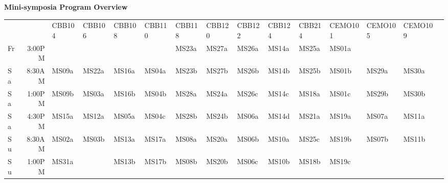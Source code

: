 \clearpage
\begin{center}
\label{prog-overview}
{\large {\bf Mini-symposia Program Overview}}

\vspace{0.5cm}
\begin{adjustbox}{width=\textwidth}
\begin{tabular}{lrlllllllllllll}
                         &        & CBB104 & CBB106 & CBB108 & CBB110 & CBB118 & CBB120 & CBB122 & CBB124 & CBB214 & CEMO101 & CEMO105 & CEMO109 \\
\rowcolor{p1color!20} Fr & 3:00PM &        &        &        &        & MS23a  & MS27a  & MS26a  & MS14a  & MS25a  & MS01a   &         &         \\
\rowcolor{p2color!30} Sa & 8:30AM & MS09a  & MS22a  & MS16a  & MS04a  & MS23b  & MS27b  & MS26b  & MS14b  & MS25b  & MS01b   & MS29a   & MS30a   \\
\rowcolor{p2color!20} Sa & 1:00PM & MS09b  & MS03a  & MS16b  & MS04b  & MS28a  & MS24a  & MS26c  & MS14c  & MS18a  & MS01c   & MS29b   & MS30b   \\
\rowcolor{p2color!10} Sa & 4:30PM & MS15a  & MS12a  & MS05a  & MS04c  & MS28b  & MS24b  & MS06a  & MS14d  & MS21a  & MS19a   & MS07a   & MS11a   \\
\rowcolor{p3color!30} Su & 8:30AM & MS02a  & MS03b  & MS13a  & MS17a  & MS08a  & MS20a  & MS06b  & MS10a  & MS25c  & MS19b   & MS07b   & MS11b   \\
\rowcolor{p3color!20} Su & 1:00PM & MS31a  &        & MS13b  & MS17b  & MS08b  & MS20b  & MS06c  & MS10b  & MS18b  & MS19c   &         &         \\
\end{tabular}
\end{adjustbox}
\vspace{2cm}



\end{center}
